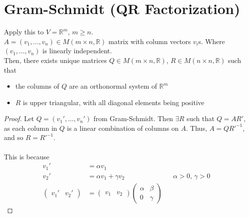 \documentclass[letterpaper,12pt]{article}
\begin{document}
\section*{Gram-Schmidt (QR Factorization)}
Apply this to $V = \mathbb{R}^m$, $m \geq n$.
\\ $A = (v_1, \dots, v_n) \in M(m \times n, \mathbb{R})$ matrix with column vectors $v_i$s. Where $(v_1, \dots, v_n)$ is linearly independent.
\\ Then, there exists unique matrices $Q \in M(m \times n, \mathbb{R})$, $R \in M(n \times n, \mathbb{R})$ such that
\begin{itemize}
    \item the columns of $Q$ are an orthonormal system of $\mathbb{R}^m$
    \item $R$ is upper triangular, with all diagonal elements being positive
\end{itemize}
\begin{proof}
Let $Q = (v_1', \dots, v_n')$ from Gram-Schmidt. Then $\exists R$ such that $Q = AR'$, as each column in $Q$ is a linear combination of columns on $A$. Thus, $A = QR'^{-1}$, and so $R = R'^{-1}$.
\\ \\ This is because
\begin{align*}
    v_1' & = \alpha v_1 \\
    v_2' & = \alpha v_1 + \gamma v_2 && \text{$\alpha > 0$, $\gamma > 0$} \\
    \begin{pmatrix} v_1' & v_2' \end{pmatrix} & = \begin{pmatrix} v_1 & v_2 \end{pmatrix} \begin{pmatrix} \alpha & \beta \\ 0 & \gamma \end{pmatrix}
\end{align*}
\end{proof}
\end{document}
